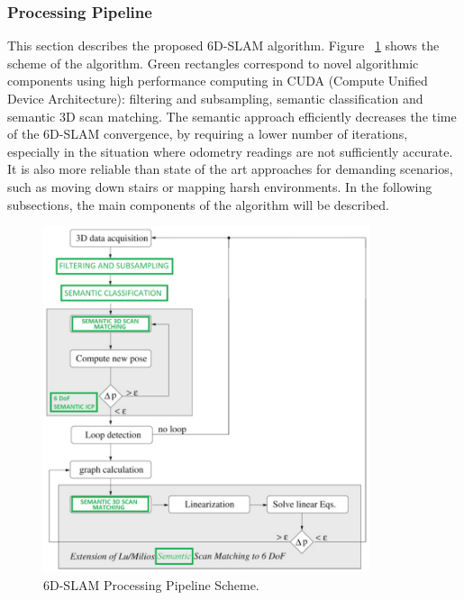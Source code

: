 \documentclass{article}
\begin{document}
\subsubsection{Processing Pipeline}
This section describes the proposed 6D-SLAM algorithm. Figure ~\ref{fig:6DSLAM} shows the scheme of the algorithm.
Green rectangles correspond to novel algorithmic components using high performance computing in CUDA (Compute Unified Device Architecture): filtering and subsampling, semantic classification and semantic 3D scan matching.
The semantic approach efficiently decreases the time of the 6D-SLAM convergence, by requiring a lower number of iterations, especially in the situation where odometry readings are not sufficiently accurate.
It is also more reliable than state of the art approaches for demanding scenarios, such as moving down stairs or mapping harsh environments.
In the following subsections, the main components of the algorithm will be described.
\begin{figure}
    \centering
    \includegraphics[height=4.0in]{ROB-15-0035_fig8.png}
    \caption{6D-SLAM Processing Pipeline Scheme.}
    \label{fig:6DSLAM}
\end{figure}
\end{document}
